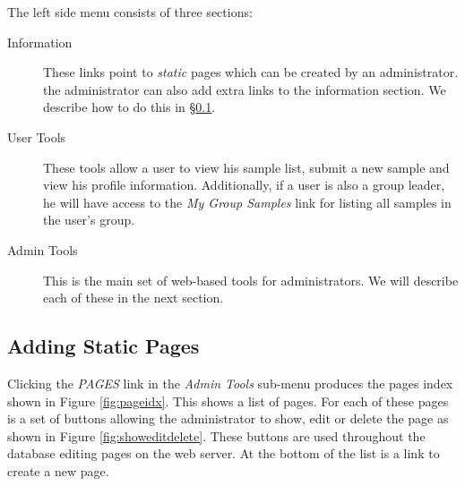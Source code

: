 \documentclass[12pt,twoside]{article}
\begin{document}
The left side menu consists of three sections:
\begin{description}
\item[Information]
These links point to \emph{static} pages which can be created by an
administrator. the administrator can also add extra links to the
information section. We describe how to do this in \S\ref{sec:static}.
\item[User Tools]
These tools allow a user to view his sample list, submit a new sample
and view his profile information. Additionally, if a user is also a group
leader, he will have access to the \emph{My Group Samples} link for listing
all samples in the user's group.
\item[Admin Tools]
This is the main set of web-based tools for administrators. We will
describe each of these in the next section.
\end{description}
\subsection{Adding Static Pages}\label{sec:static}

Clicking the \emph{PAGES} link in the \emph{Admin Tools} sub-menu 
produces the pages index shown in Figure \ref{fig:pageidx}.
This shows a list of pages. For each of these pages is a set of buttons
allowing the administrator to show, edit or delete the page as shown in
Figure \ref{fig:showeditdelete}.
These buttons are used throughout the database editing pages on the web server.
At the bottom of the list is a link to create a new page.

\end{document}
